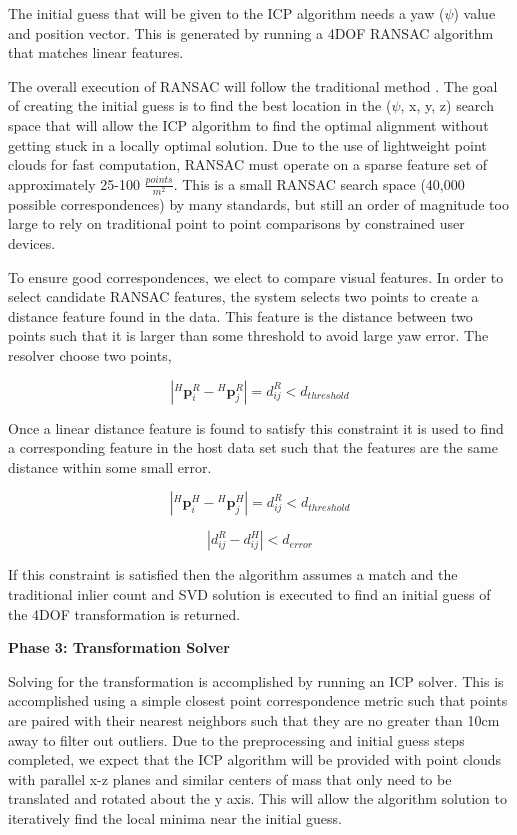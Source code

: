 \documentclass{vgtc}                          %
\begin{document}
 The initial guess that will be given to the ICP algorithm needs a yaw ($\psi$) value and position vector. This is generated by running a 4DOF RANSAC algorithm that matches linear features. 

The overall execution of RANSAC will follow the traditional method \cite{RANSAC}. The goal of creating the initial guess is to find the best location in 
the ($\psi$, x, y, z) search space that will allow the ICP algorithm to find the optimal alignment without getting stuck in a locally optimal solution. Due to 
the use of lightweight point clouds for fast computation, RANSAC must operate on a sparse feature set of approximately 25-100 $\frac{points}{m^2}$. This is a 
small RANSAC search space (40,000 possible correspondences) by many standards, but still an order of magnitude too large to rely on traditional point to point 
comparisons by constrained user devices.

To ensure good correspondences, we elect to compare visual features. In order to select candidate RANSAC features, the system selects 
two points to create a distance feature found in the data. This feature is the distance between two points such that it is larger than some threshold to 
avoid large yaw error. The resolver choose two points,

\begin{equation}
    |{}^H\textbf{p}^{R}_i - {}^H\textbf{p}^{R}_j| = d^R_{ij} < d_{threshold}
\end{equation}

Once a linear distance feature is found to satisfy this constraint it is used to find a corresponding feature in the host data set such that the features 
are the same distance within some small error.

\begin{equation}
    |{}^H\textbf{p}^{H}_i - {}^H\textbf{p}^{H}_j| = d^R_{ij} < d_{threshold}
\end{equation}

\begin{equation}
    |d^R_{ij} - d^H_{ij}| < d_{error}
\end{equation}


If this constraint is satisfied then the algorithm assumes a match and the traditional inlier count and SVD solution is executed to find an initial guess 
of the 4DOF transformation is returned.

{\bf Phase 3: Transformation Solver}

Solving for the transformation is accomplished by running an ICP solver\cite{simpleICP}. This is accomplished using a simple closest point correspondence 
metric such that points are paired with their nearest neighbors such that they are no greater than 10cm away to filter out outliers. Due to the 
preprocessing and initial guess steps completed, we expect that the ICP algorithm will be provided with point clouds with parallel x-z planes and similar 
centers of mass that only need to be translated and rotated about the y axis. This will allow the algorithm solution to iteratively find the local minima near the 
initial guess. %
\end{document}
